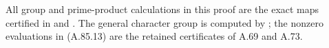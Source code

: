 All group and prime-product calculations in this proof
are the exact maps certified in
 and
.
The general character group is computed by
;
the nonzero evaluations in (A.85.13) are the retained
certificates of A.69 and A.73.
